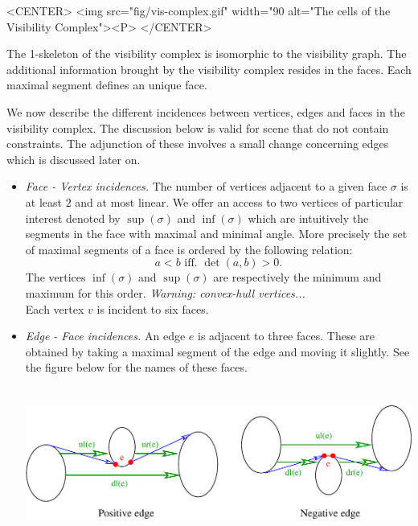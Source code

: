 \begin{ccHtmlOnly}
    <CENTER>
        <img src="fig/vis-complex.gif" width="90%
	 alt="The cells of the Visibility Complex"><P>
    </CENTER>
\end{ccHtmlOnly}

The 1-skeleton of the visibility complex is isomorphic to the visibility graph.
The additional information brought by the visibility complex resides in the
faces. Each maximal segment defines an unique face.

We now describe the different incidences between vertices, edges and faces in
the visibility complex. The discussion below is valid for scene that do not
contain constraints. The adjunction of these involves a small change concerning
edges which is discussed later on.
\begin{itemize}
    \item \emph{Face - Vertex incidences. } The number of vertices adjacent to a
    given face $\sigma$ is at least $2$ and at most linear. We offer an access
    to two vertices of particular interest denoted by $\sup(\sigma)$ and 
    $\inf(\sigma)$ which are intuitively the segments in the face with maximal 
    and minimal angle. More precisely the set of maximal segments of a face is
    ordered by the following relation:
    \begin{equation}
		    a < b \textrm{ iff. } \det(a,b) > 0.
    \end{equation}
    The vertices $\inf(\sigma)$ and $\sup(\sigma)$ are respectively the minimum
    and maximum for this order. \emph{Warning: convex-hull vertices...}\\
    Each vertex $v$ is incident to six faces. 
    \item \emph{Edge - Face incidences. } An edge $e$ is adjacent to three
    faces. These are obtained by taking a maximal segment of the edge and moving
    it slightly. See the figure below for the names of these faces.

    \begin{ccTexOnly}
	\begin{center}
	    \includegraphics[height=5cm,width=\linewidth]{fig/edge-face.eps}%
	\end{center}
    \end{ccTexOnly}


\end{itemize}
